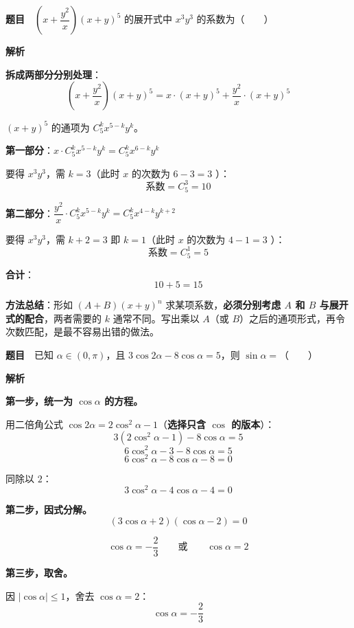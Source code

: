 \par\medskip


\textbf{题目}　$\left(x+\dfrac{y^{2}}x\right)(x+y)^{5}$ 的展开式中 $x^{3}y^{3}$ 的系数为（　　）

\textbf{解析}

\textbf{拆成两部分分别处理}：
\[\left(x+\frac{y^{2}}x\right)(x+y)^{5}=x\cdot(x+y)^{5}+\frac{y^{2}}x\cdot(x+y)^{5}\]

$(x+y)^{5}$ 的通项为 $C_5^{k}x^{5-k}y^{k}$。

\textbf{第一部分}：$x\cdot C_5^{k}x^{5-k}y^{k}=C_5^{k}x^{6-k}y^{k}$

要得 $x^{3}y^{3}$，需 $k=3$（此时 $x$ 的次数为 $6-3=3$ ）：
\[\text{系数}=C_5^{3}=10\]

\textbf{第二部分}：$\dfrac{y^{2}}x\cdot C_5^{k}x^{5-k}y^{k}=C_5^{k}x^{4-k}y^{k+2}$

要得 $x^{3}y^{3}$，需 $k+2=3$ 即 $k=1$（此时 $x$ 的次数为 $4-1=3$ ）：
\[\text{系数}=C_5^{1}=5\]

\textbf{合计}：
\[10+5=15\]


\begin{gktip}
\textbf{方法总结}：形如 $(A+B)(x+y)^{n}$ 求某项系数，\textbf{必须分别考虑 $A$ 和 $B$ 与展开式的配合}，两者需要的 $k$ 通常不同。写出乘以 $A$（或 $B$）之后的通项形式，再令次数匹配，是最不容易出错的做法。
\end{gktip}

\par\medskip


\textbf{题目}　已知 $\alpha\in(0,\pi)$，且 $3\cos2\alpha-8\cos\alpha=5$，则 $\sin\alpha=$（　　）

\textbf{解析}

\textbf{第一步，统一为 $\cos\alpha$ 的方程。}

用二倍角公式 $\cos2\alpha=2\cos^{2}\alpha-1$（\textbf{选择只含 $\cos$ 的版本}）：
\[3\left(2\cos^{2}\alpha-1\right)-8\cos\alpha=5\]
\[6\cos^{2}\alpha-3-8\cos\alpha=5\]
\[6\cos^{2}\alpha-8\cos\alpha-8=0\]

同除以 $2$：
\[3\cos^{2}\alpha-4\cos\alpha-4=0\]

\textbf{第二步，因式分解。}
\[(3\cos\alpha+2)(\cos\alpha-2)=0\]

\[\cos\alpha=-\frac23\qquad\text{或}\qquad\cos\alpha=2\]

\textbf{第三步，取舍。}

因 $|\cos\alpha|\le1$，舍去 $\cos\alpha=2$：
\[\cos\alpha=-\frac23\]

